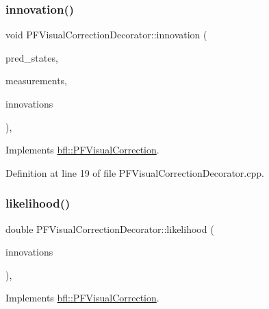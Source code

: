 \subsubsection{\texorpdfstring{innovation()}{innovation()}}
{\footnotesize\ttfamily void P\+F\+Visual\+Correction\+Decorator\+::innovation (\begin{DoxyParamCaption}\item[{const Eigen\+::\+Ref$<$ const Eigen\+::\+Matrix\+Xf $>$ \&}]{pred\+\_\+states,  }\item[{cv\+::\+Input\+Array}]{measurements,  }\item[{Eigen\+::\+Ref$<$ Eigen\+::\+Matrix\+Xf $>$}]{innovations }\end{DoxyParamCaption})\hspace{0.3cm}{\ttfamily [override]}, {\ttfamily [virtual]}}



Implements \mbox{\hyperlink{classbfl_1_1PFVisualCorrection_acbc20b602ce5277407bf6afe8d7b4b29}{bfl\+::\+P\+F\+Visual\+Correction}}.



Definition at line 19 of file P\+F\+Visual\+Correction\+Decorator.\+cpp.

\mbox{\label{classbfl_1_1PFVisualCorrectionDecorator_a6e1f993c57e8bdbb03ad6996aa122c6c}} 
\subsubsection{\texorpdfstring{likelihood()}{likelihood()}}
{\footnotesize\ttfamily double P\+F\+Visual\+Correction\+Decorator\+::likelihood (\begin{DoxyParamCaption}\item[{const Eigen\+::\+Ref$<$ const Eigen\+::\+Matrix\+Xf $>$ \&}]{innovations }\end{DoxyParamCaption})\hspace{0.3cm}{\ttfamily [override]}, {\ttfamily [virtual]}}



Implements \mbox{\hyperlink{classbfl_1_1PFVisualCorrection_a57527f43323af18321bd9654a4bb00d5}{bfl\+::\+P\+F\+Visual\+Correction}}.



